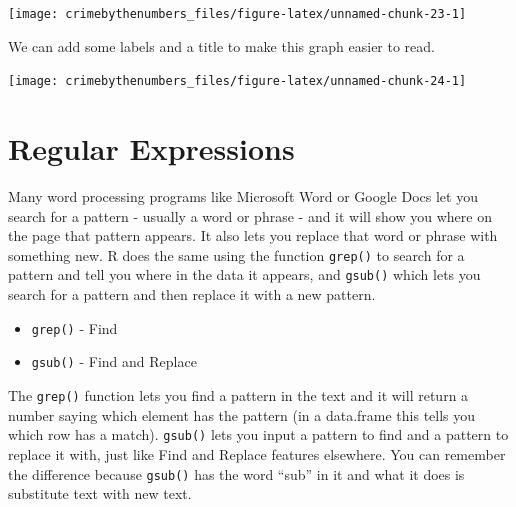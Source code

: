 \documentclass[
  12pt,
]{book}
\newenvironment{Shaded}{\begin{snugshade}}{\end{snugshade}}
\newcommand{\AttributeTok}[1]{\textcolor[rgb]{0.61,0.61,0.61}{#1}}
\newcommand{\FunctionTok}[1]{\textcolor[rgb]{0,0,0}{#1}}
\newcommand{\NormalTok}[1]{#1}
\newcommand{\SpecialCharTok}[1]{\textcolor[rgb]{0,0,0}{#1}}
\newcommand{\StringTok}[1]{\textcolor[rgb]{0.5,0.5,0.5}{#1}}
\providecommand{\tightlist}{%
  \setlength{\itemsep}{0pt}\setlength{\parskip}{0pt}}
\begin{document}
\begin{center}\texttt{[image: crimebythenumbers\_files/figure-latex/unnamed-chunk-23-1]} \end{center}

We can add some labels and a title to make this graph easier to read.

\begin{Shaded}
\end{Shaded}

\begin{center}\texttt{[image: crimebythenumbers\_files/figure-latex/unnamed-chunk-24-1]} \end{center}

\hypertarget{regular-expressions}{%
\chapter{Regular Expressions}\label{regular-expressions}}

Many word processing programs like Microsoft Word or Google Docs let you search for a pattern - usually a word or phrase - and it will show you where on the page that pattern appears. It also lets you replace that word or phrase with something new. R does the same using the function \texttt{grep()} to search for a pattern and tell you where in the data it appears, and \texttt{gsub()} which lets you search for a pattern and then replace it with a new pattern.

\begin{itemize}
\tightlist
\item
  \texttt{grep()} - Find
\item
  \texttt{gsub()} - Find and Replace
\end{itemize}

The \texttt{grep()} function lets you find a pattern in the text and it will return a number saying which element has the pattern (in a data.frame this tells you which row has a match). \texttt{gsub()} lets you input a pattern to find and a pattern to replace it with, just like Find and Replace features elsewhere. You can remember the difference because \texttt{gsub()} has the word ``sub'' in it and what it does is substitute text with new text.
\end{document}
